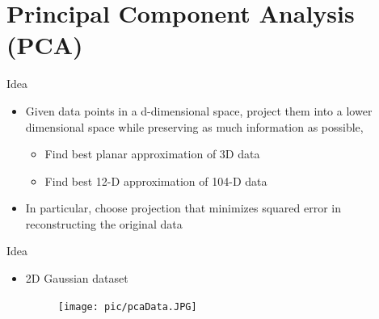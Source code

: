 \documentclass[serif, aspectratio=169]{beamer}
\begin{document}
\section{Principal Component Analysis (PCA)}

\begin{frame}{Idea}
    \begin{itemize}
        \item Given data points in a d-dimensional space, project them into a lower dimensional space while preserving as much information as possible,
        \begin{itemize}
            \item Find best planar approximation of 3D data
            \item Find best 12-D approximation of 104-D data
        \end{itemize}
        \item In particular, choose projection that minimizes squared error in reconstructing the original data
    \end{itemize}
\end{frame}

\begin{frame}{Idea}
    \begin{itemize}
        \item 2D Gaussian dataset
         \begin{figure}[htpb]
            \begin{center}
                \texttt{[image: pic/pcaData.JPG]}
            \end{center}
        \end{figure}
    \end{itemize}
\end{frame}
\end{document}
